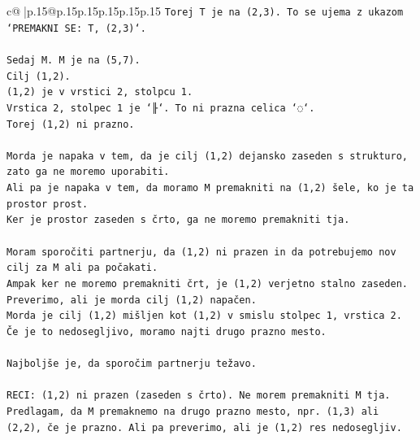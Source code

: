 \documentclass{article}
\begin{document}
{\begin{supertabular}{c@{$\;$}|p{.15\linewidth}@{}p{.15\linewidth}p{.15\linewidth}p{.15\linewidth}p{.15\linewidth}p{.15\linewidth}}
{{{\texttt{Torej T je na (2,3). To se ujema z ukazom `PREMAKNI SE: T, (2,3)`.} \\
\\ 
\texttt{Sedaj M. M je na (5,7).} \\
\texttt{Cilj (1,2).} \\
\texttt{(1,2) je v vrstici 2, stolpcu 1.} \\
\texttt{Vrstica 2, stolpec 1 je `╟`. To ni prazna celica `◌`.} \\
\texttt{Torej (1,2) ni prazno.} \\
\\ 
\texttt{Morda je napaka v tem, da je cilj (1,2) dejansko zaseden s strukturo, zato ga ne moremo uporabiti.} \\
\texttt{Ali pa je napaka v tem, da moramo M premakniti na (1,2) šele, ko je ta prostor prost.} \\
\texttt{Ker je prostor zaseden s črto, ga ne moremo premakniti tja.} \\
\\ 
\texttt{Moram sporočiti partnerju, da (1,2) ni prazen in da potrebujemo nov cilj za M ali pa počakati.} \\
\texttt{Ampak ker ne moremo premakniti črt, je (1,2) verjetno stalno zaseden.} \\
\texttt{Preverimo, ali je morda cilj (1,2) napačen.} \\
\texttt{Morda je cilj (1,2) mišljen kot (1,2) v smislu stolpec 1, vrstica 2.} \\
\texttt{Če je to nedosegljivo, moramo najti drugo prazno mesto.} \\
\\ 
\texttt{Najboljše je, da sporočim partnerju težavo.} \\
\\ 
\texttt{RECI: (1,2) ni prazen (zaseden s črto). Ne morem premakniti M tja. Predlagam, da M premaknemo na drugo prazno mesto, npr. (1,3) ali (2,2), če je prazno. Ali pa preverimo, ali je (1,2) res nedosegljiv.} \\
            }
        }
    }
     \\ \\


\end{supertabular}}
\end{document}
